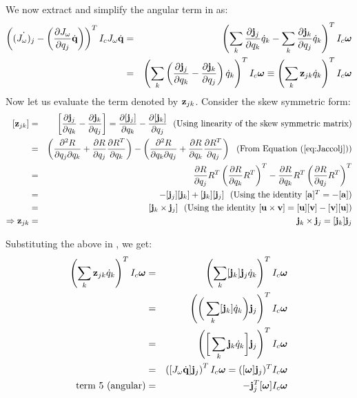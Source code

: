 We now extract and simplify the angular term in  as:
\begin{eqnarray}
\label{eq:term5_ang}
\nonumber
\left( \dot{(J_\omega)_j}  - \left(\frac{\partial J_\omega}{\partial q_j}\dot{\mathbf{q}}\right) \right )^T I_c J_\omega \dot{\mathbf{q}} & = & \left( \sum_k \frac{\partial \mathbf{j}_j}{\partial q_k}\dot{q}_k -  \sum_k \frac{\partial \mathbf{j}_k}{\partial q_j} \dot{q}_k \right )^T I_c \bm{\omega}\\
& = & \left( \sum_k \left ( \frac{\partial \mathbf{j}_j}{\partial q_k}  -  \frac{\partial \mathbf{j}_k}{\partial q_j}\right ) \dot{q}_k \right )^T I_c \bm{\omega} \equiv \left ( \sum_k \mathbf{z}_{jk} \dot{q}_k \right )^T I_c\bm{\omega} 
\end{eqnarray}
Now let us evaluate the term denoted by $\mathbf{z}_{jk}$. Consider the skew symmetric form:
\begin{eqnarray}
\nonumber
[\vc{z}_{jk}] & = & \left [ \frac{\partial \vc{j}_j}{\partial q_k}  -  \frac{\partial \vc{j}_k}{\partial q_j} \right ] = \frac{\partial [\vc{j}_j]}{\partial q_k}  -  \frac{\partial [\vc{j}_k]}{\partial q_j} \mbox{\ \ (Using linearity of the skew symmetric matrix)}\\
\nonumber
& = & \left ( \frac{\partial^2 R}{\partial q_j \partial q_k} + \frac{\partial R}{\partial q_j} \frac{\partial R^T}{\partial q_k} \right ) - \left ( \frac{\partial^2 R}{\partial q_k \partial q_j} + \frac{\partial R}{\partial q_k} \frac{\partial R^T}{\partial q_j} \right ) \mbox{\ \ (From \eqnref{Jaccolj})}\\
\nonumber
& = & \frac{\partial R}{\partial q_j}R^T \left( \frac{\partial R}{\partial q_k}R^T\right)^T - \frac{\partial R}{\partial q_k}R^T \left( \frac{\partial R}{\partial q_j}R^T\right)^T\\
\nonumber
& = & -[\vc{j}_j][\vc{j}_k] + [\vc{j}_k][\vc{j}_j] \mbox{\ \ (Using the identity $[\vc{a}]^T = -[\vc{a}]$)}\\
\nonumber
& = & [\vc{j}_k\times \vc{j}_j] \mbox{\ \ (Using the identity $[\vc{u}\times \vc{v}] = [\vc{u}][\vc{v}] - [\vc{v}][\vc{u}]$)}\\
\Rightarrow \vc{z}_{jk} & = & \vc{j}_k\times \vc{j}_j = [\vc{j}_k] \vc{j}_j
\end{eqnarray}

Substituting the above in , we get:
\begin{eqnarray}
\label{eq:term5_ang_final}
\nonumber
\left ( \sum_k \mathbf{z}_{jk} \dot{q}_k \right )^T I_c\bm{\omega}  & = & \left ( \sum_k [\mathbf{j}_k] \mathbf{j}_j \dot{q}_k \right )^T I_c\bm{\omega} \\
\nonumber
& = & \left ( \bigg ( \sum_k [\mathbf{j}_k]\dot{q}_k \bigg ) \mathbf{j}_j \right )^T I_c\bm{\omega}\\
\nonumber
& = & \left ( \bigg [ \sum_k \mathbf{j}_k \dot{q}_k \bigg ] \mathbf{j}_j \right )^T I_c\bm{\omega} \\
\nonumber
& = & \left ( [ J_\omega \dot{\mathbf{q}} ] \mathbf{j}_j \right )^T I_c\bm{\omega} = ([\bm{\omega}]\mathbf{j}_j)^TI_c\bm{\omega}\\
\mbox{term 5 (angular)} & = & -\mathbf{j}_j^T [\bm{\omega}] I_c\bm{\omega}
\end{eqnarray} 

